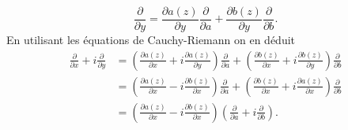 {{$$\frac{\partial }{\partial y}= \frac{\partial a(z)}{\partial y}\frac{\partial }{\partial a}+\frac{\partial b(z)}{\partial y}\frac{\partial }{\partial b}.$$
En utilisant les \'equations de Cauchy-Riemann on en d\'eduit
$$\begin{aligned}
\frac{\partial }{\partial x}+i\frac{\partial }{\partial y}&= \left(\frac{\partial a(z)}{\partial x}+i \frac{\partial a(z)}{\partial y} \right)\frac{\partial }{\partial a}
+ \left(\frac{\partial b(z)}{\partial x}+i \frac{\partial b(z)}{\partial y} \right)\frac{\partial }{\partial b}\\
&= \left(\frac{\partial a(z)}{\partial x}-i \frac{\partial b(z)}{\partial x} \right)\frac{\partial }{\partial a}
+ \left(\frac{\partial b(z)}{\partial x}+i \frac{\partial a(z)}{\partial x} \right)\frac{\partial }{\partial b}\\
&=\left(\frac{\partial a(z)}{\partial x}-i \frac{\partial b(z)}{\partial x} \right)\left(\frac{\partial }{\partial a}+i\frac{\partial }{\partial b}\right).
\end{aligned}$$
}
}
